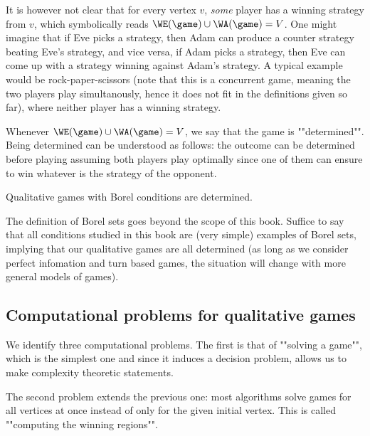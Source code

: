 It is however not clear that for every vertex $v$, \textit{some} player has a winning strategy from $v$,
which symbolically reads $\WE(\game) \cup \WA(\game) = V$.
One might imagine that if Eve picks a strategy, then Adam can produce a counter strategy beating Eve's strategy, 
and vice versa, if Adam picks a strategy, then Eve can come up with a strategy winning against Adam's strategy.
A typical example would be rock-paper-scissors (note that this is a concurrent game, meaning the two players play simultanously,
hence it does not fit in the definitions given so far), where neither player has a winning strategy.

Whenever $\WE(\game) \cup \WA(\game) = V$, we say that the game is ""determined"".
Being determined can be understood as follows: the outcome can be determined before playing assuming both players play optimally since one of them can ensure to win whatever is the strategy of the opponent.

\begin{theorem}
\label{1-thm:borel_determinacy}
Qualitative games with Borel conditions are determined.
\end{theorem}

The definition of Borel sets goes beyond the scope of this book. 
Suffice to say that all conditions studied in this book are (very simple) examples of Borel sets,
implying that our qualitative games are all determined 
(as long as we consider perfect infomation and turn based games, the situation will change with more general models of games).

\subsection*{Computational problems for qualitative games}
We identify three computational problems.
The first is that of ""solving a game"", which is the simplest one and since it induces a decision problem, allows us 
to make complexity theoretic statements.


The second problem extends the previous one: most algorithms solve games for all vertices at once instead of only for the given initial vertex.
This is called ""computing the winning regions"".


